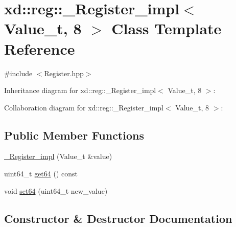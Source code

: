 \hypertarget{classxd_1_1reg_1_1___register__impl_3_01_value__t_00_018_01_4}{}\section{xd\+:\+:reg\+:\+:\+\_\+\+Register\+\_\+impl$<$ Value\+\_\+t, 8 $>$ Class Template Reference}
\label{classxd_1_1reg_1_1___register__impl_3_01_value__t_00_018_01_4}


{\ttfamily \#include $<$Register.\+hpp$>$}



Inheritance diagram for xd\+:\+:reg\+:\+:\+\_\+\+Register\+\_\+impl$<$ Value\+\_\+t, 8 $>$\+:


Collaboration diagram for xd\+:\+:reg\+:\+:\+\_\+\+Register\+\_\+impl$<$ Value\+\_\+t, 8 $>$\+:
\subsection*{Public Member Functions}
\begin{DoxyCompactItemize}
\item 
\mbox{\hyperlink{classxd_1_1reg_1_1___register__impl_3_01_value__t_00_018_01_4_aa569fec02a6763758241cdf00554ee06}{\+\_\+\+Register\+\_\+impl}} (Value\+\_\+t \&value)
\item 
uint64\+\_\+t \mbox{\hyperlink{classxd_1_1reg_1_1___register__impl_3_01_value__t_00_018_01_4_a3b5ba824d3c120e1ea26a63ff8c62e5e}{get64}} () const
\item 
void \mbox{\hyperlink{classxd_1_1reg_1_1___register__impl_3_01_value__t_00_018_01_4_af369f47dee53a675d81c199184b192b2}{set64}} (uint64\+\_\+t new\+\_\+value)
\end{DoxyCompactItemize}


\subsection{Constructor \& Destructor Documentation}
\mbox{\label{classxd_1_1reg_1_1___register__impl_3_01_value__t_00_018_01_4_aa569fec02a6763758241cdf00554ee06}} 
